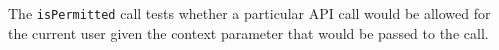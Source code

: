 The \verb+isPermitted+ call tests whether a particular API call would be allowed for the current user
given the context parameter that would be passed to the call.
